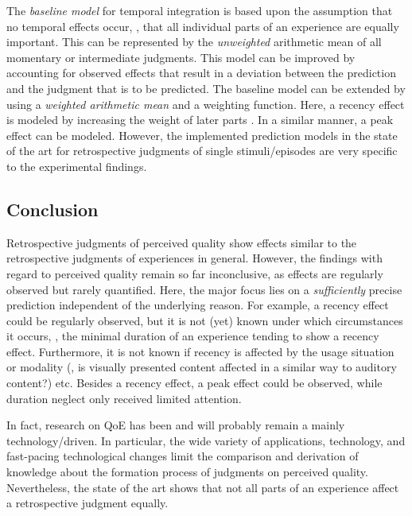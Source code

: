 The \emph{baseline model} for temporal integration is based upon the assumption that no temporal effects occur, \ie, that all individual parts of an experience are equally important.
This can be represented by the \emph{unweighted} arithmetic mean of all momentary or intermediate judgments.
This model can be improved by accounting for observed effects that result in a deviation between the prediction and the judgment that is to be predicted.
The baseline model can be extended by using a \emph{weighted arithmetic mean} and a weighting function.
Here, a recency effect is modeled by increasing the weight of later parts \citep[][]{rosenbluth_testing_1998, weiss_modeling_2009, hamberg_time-varying_1999}.
In a similar manner, a peak effect can be modeled.
However, the implemented prediction models in the state of the art for retrospective judgments of single stimuli/episodes are very specific to the experimental findings.

\subsection{Conclusion}
Retrospective judgments of perceived quality show effects similar to the retrospective judgments of experiences in general.
However, the findings with regard to perceived quality remain so far inconclusive, as effects are regularly observed but rarely quantified.
Here, the major focus lies on a \emph{sufficiently} precise prediction independent of the underlying reason.
For example, a recency effect could be regularly observed, but it is not (yet) known under which circumstances it occurs, \eg, the minimal duration of an experience tending to show a recency effect.
Furthermore, it is not known if recency is affected by the usage situation or modality (\eg, is visually presented content affected in a similar way to auditory content?) etc.
Besides a recency effect, a peak effect could be observed, while duration neglect only received limited attention.

In fact, research on \ac{QoE} has been and will probably remain a mainly technology\-/driven.
In particular, the wide variety of applications, technology, and fast-pacing technological changes limit the comparison and derivation of knowledge about the formation process of judgments on perceived quality.
Nevertheless, the state of the art shows that not all parts of an experience affect a retrospective judgment equally.
